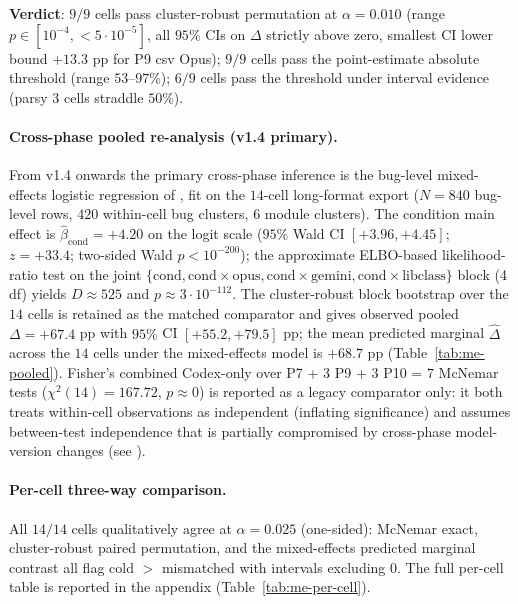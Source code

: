\textbf{Verdict}: $9/9$ cells pass cluster-robust permutation at $\alpha = 0.010$ (range $p \in [10^{-4}, < 5\!\cdot\!10^{-5}]$, all $95\%$ CIs on $\Delta$ strictly above zero, smallest CI lower bound $+13.3$ pp for P9 csv Opus); $9/9$ cells pass the point-estimate absolute threshold (range $53$--$97\%$); $6/9$ cells pass the threshold under interval evidence (parsy 3 cells straddle $50\%$).

\paragraph{Cross-phase pooled re-analysis (v1.4 primary).} From v1.4 onwards the primary cross-phase inference is the bug-level mixed-effects logistic regression of , fit on the $14$-cell long-format export ($N=840$ bug-level rows, $420$ within-cell bug clusters, $6$ module clusters). The condition main effect is $\widehat{\beta}_{\text{cond}} = +4.20$ on the logit scale ($95\%$ Wald CI $[+3.96, +4.45]$; $z = +33.4$; two-sided Wald $p < 10^{-200}$); the approximate ELBO-based likelihood-ratio test on the joint $\{\text{cond}, \text{cond}\!\times\!\text{opus}, \text{cond}\!\times\!\text{gemini}, \text{cond}\!\times\!\text{libclass}\}$ block (4 df) yields $D \approx 525$ and $p \approx 3 \cdot 10^{-112}$. The cluster-robust block bootstrap over the $14$ cells is retained as the matched comparator and gives observed pooled $\Delta = +67.4$ pp with $95\%$ CI $[+55.2, +79.5]$ pp; the mean predicted marginal $\widehat{\Delta}$ across the $14$ cells under the mixed-effects model is $+68.7$ pp (Table~\ref{tab:me-pooled}). Fisher's combined Codex-only over P7 + 3 P9 + 3 P10 = $7$ McNemar tests ($\chi^2(14) = 167.72$, $p \approx 0$) is reported as a legacy comparator only: it both treats within-cell observations as independent (inflating significance) and assumes between-test independence that is partially compromised by cross-phase model-version changes (see ).

\paragraph{Per-cell three-way comparison.} All $14/14$ cells qualitatively agree at $\alpha = 0.025$ (one-sided): McNemar exact, cluster-robust paired permutation, and the mixed-effects predicted marginal contrast all flag cold $>$ mismatched with intervals excluding $0$. The full per-cell table is reported in the appendix (Table~\ref{tab:me-per-cell}).

